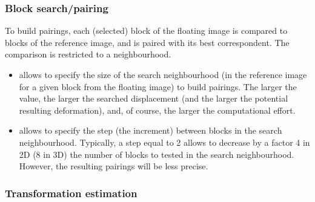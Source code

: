 \subsubsection{Block search/pairing}
\label{sec:parameters:block:pairing}

To build pairings, each (selected) block of the floating image is compared to blocks of the reference image, and is paired with its best correspondent. The comparison is restricted to a neighbourhood.
 
\begin{itemize}
\item[]  allows to specify the size of the search neighbourhood (in the reference image for a given block from the floating image) to build pairings. The larger the value, the larger the searched displacement (and the larger the potential resulting deformation),  and, of course, the larger the computational effort.

\item[]  allows to specify the step (the increment) between blocks in the search neighbourhood. Typically, a step equal to 2 allows to decrease by a factor 4 in 2D (8 in 3D) the number of blocks to tested in the search neighbourhood. However, the resulting pairings will be less precise.

\end{itemize}



\subsubsection{Transformation estimation}
\label{sec:parameters:transformation:estimation}

